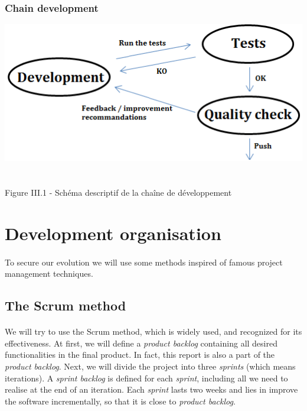 \documentclass{report}
\begin{document}
\subsubsection{Chain development}

\begin{center}
\includegraphics[scale=0.7]{data/cycle_qualite}
~\\~\\Figure III.1 - Sch\'{e}ma descriptif de la cha\^{i}ne de d\'{e}veloppement
\end{center}

\section{Development organisation}

\paragraph{}
\hspace{4mm}\textnormal{To secure our evolution we will use some methods inspired of famous project management techniques.}

\subsection{The Scrum method}

\paragraph{}
\hspace{4mm}\textnormal{We will try to use the Scrum method, which is widely used, and recognized for its effectiveness. At first, we will define a \textit{product backlog} containing all desired functionalities in the final product. In fact, this report is also a part of the \textit{product backlog}. 
Next, we will divide the project into three \textit{sprints} (which means iterations). A \textit{sprint backlog} is defined for each \textit{sprint}, including all we need to realise at the end of an iteration. Each \textit{sprint} lasts two weeks and lies in improve the software 
incrementally, so that it is close to \textit{product backlog}.}
\end{document}
